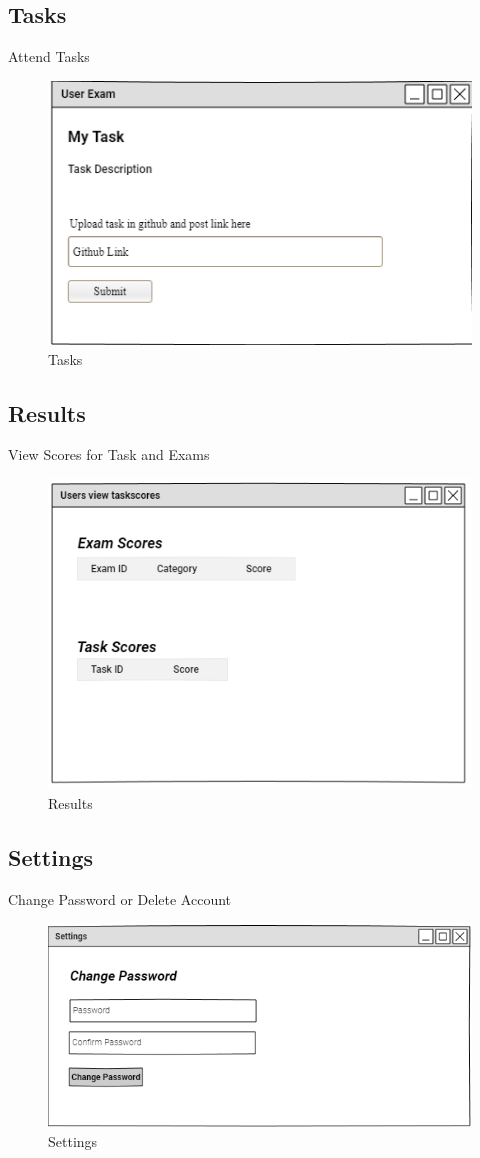 \documentclass[a4paper,12pt]{report}
\begin{document}
\subsection {Tasks}
Attend Tasks
\begin{figure}[bph]
	\centering
	\includegraphics[width=.6\linewidth ]{img/user/usertasks}
\caption{Tasks}
\end{figure}

\subsection {Results}
View Scores for Task and Exams
\begin{figure}[bph]
	\centering
	\includegraphics[width=.6\linewidth ]{img/user/userviewscr}
\caption{Results}
\end{figure}
\pagebreak

\pagebreak
\subsection {Settings}
Change Password or Delete Account
\begin{figure}[bph]
	\centering
	\includegraphics[width=.6\linewidth ]{img/user/userstings}
	\caption{Settings}
\end{figure}
\end{document}
